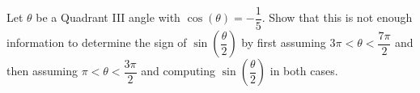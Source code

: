 {Let $\theta$ be a Quadrant III angle with $\cos(\theta) = -\dfrac{1}{5}$.  Show that this is not enough information to determine the sign of  $\sin\left(\dfrac{\theta}{2}\right)$ by first assuming $3\pi < \theta < \dfrac{7\pi}{2}$ and then assuming $\pi < \theta < \dfrac{3\pi}{2}$ and computing $\sin\left(\dfrac{\theta}{2}\right)$ in both cases.}
{}